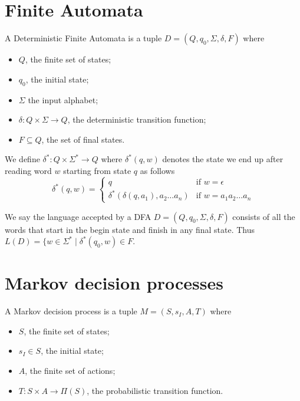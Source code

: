 \section{Finite Automata}

\begin{definition}[DFA]
A Deterministic Finite Automata is a tuple $D=(Q,q_0,\Sigma,\delta,F)$ where 
\begin{itemize}
\item $Q$, the finite set of states;
\item $q_0$, the initial state;
\item $\Sigma$ the input alphabet;
\item $\delta: Q\times\Sigma\to Q$, the deterministic transition function;
\item $F\subseteq Q$, the set of final states.
\end{itemize}
\end{definition}

\begin{definition}
We define $\delta^*:Q\times\Sigma^*\to Q$ where $\delta^*(q,w)$ denotes the state we end up after reading word $w$ starting from state $q$ as follows
\begin{equation*}
\delta^*(q,w)=\begin{cases}
	q &\text{if } w=\epsilon \\
	\delta^*(\delta(q,a_1),a_2\dots a_n) & \text{if } w=a_1a_2\dots a_n
	\end{cases}
\end{equation*}
\end{definition}


\begin{definition}
We say the language accepted by a DFA $D=(Q,q_0,\Sigma,\delta,F)$ consists of all the words that start in the begin state and finish in any final state. Thus $L(D)=\{w\in\Sigma^*\mid \delta^*(q_0,w)\in F$.
\end{definition}



\section{Markov decision processes}

\begin{definition}[MDP]
	A Markov decision process is a tuple $M=(S,s_I,A,T)$ where 
	\begin{itemize}
		\item $S$, the finite set of states;
		\item $s_I\in S$, the initial state;
		\item $A$, the finite set of actions;
		\item $T:S\times A\to \Pi(S)$, the probabilistic transition function.
	\end{itemize}
\end{definition}

